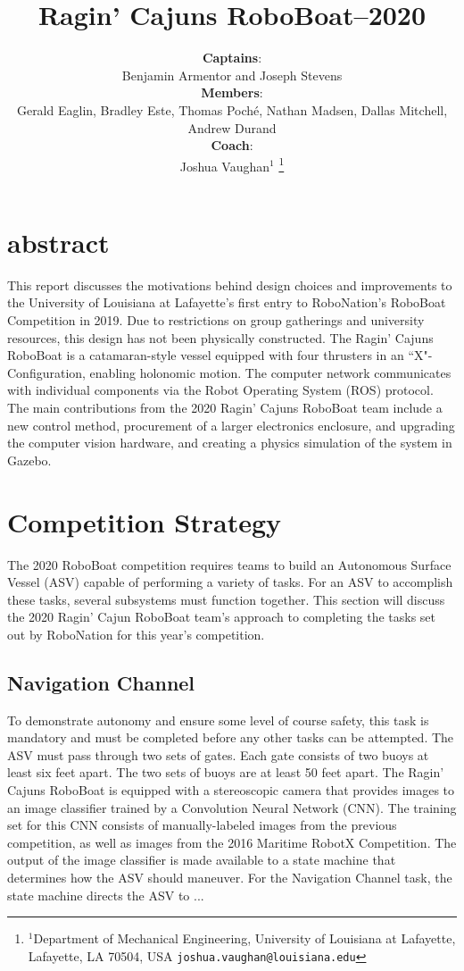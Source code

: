 \documentclass[letterpaper, 10 pt, conference]{ieeeconf}
\title{\LARGE \bf Ragin' Cajuns RoboBoat--2020}
\author{\textbf{Captains}:\\Benjamin Armentor and Joseph Stevens\\
\textbf{Members}:\\Gerald Eaglin, Bradley Este, Thomas Poché, Nathan Madsen, Dallas Mitchell, Andrew Durand\\
\textbf{Coach}:\\Joshua Vaughan$^{1}$%
\thanks{$^{1}$Department of Mechanical Engineering,
        University of Louisiana at Lafayette, Lafayette, LA 70504, USA
        {\tt\small joshua.vaughan@louisiana.edu}}%
}
\begin{document}
\maketitle
\thispagestyle{empty}
\section{abstract}
This report discusses the motivations behind design choices and improvements to the University of Louisiana at Lafayette's first entry to RoboNation's RoboBoat Competition in 2019. Due to restrictions on group gatherings and university resources, this design has not been physically constructed.  The Ragin' Cajuns RoboBoat is a catamaran-style vessel equipped with four thrusters in an ``X"-Configuration, enabling holonomic motion. The computer network communicates with individual components via the Robot Operating System (ROS) protocol. The main contributions from the 2020 Ragin' Cajuns RoboBoat team include a new control method, procurement of a larger electronics enclosure, and upgrading the computer vision hardware, and creating a physics simulation of the system in Gazebo.
\section{Competition Strategy}
The 2020 RoboBoat competition requires teams to build an Autonomous Surface Vessel (ASV) capable of performing a variety of tasks. For an ASV to accomplish these tasks, several subsystems must function together. This section will discuss the 2020 Ragin' Cajun RoboBoat team's approach to completing the tasks set out by RoboNation for this year's competition.

\subsection{Navigation Channel}
\label{NavigationChannel}
To demonstrate autonomy and ensure some level of course safety, this task is mandatory and must be completed before any other tasks can be attempted. The ASV must pass through two sets of gates. Each gate consists of two buoys at least six feet apart. The two sets of buoys are at least 50 feet apart. The Ragin' Cajuns RoboBoat is equipped with a stereoscopic camera that provides images to an image classifier trained by a Convolution Neural Network (CNN). The training set for this CNN consists of manually-labeled images from the previous competition, as well as images from the 2016 Maritime RobotX Competition. The output of the image classifier is made available to a state machine that determines how the ASV should maneuver. For the Navigation Channel task, the state machine directs the ASV to ...
\end{document}
